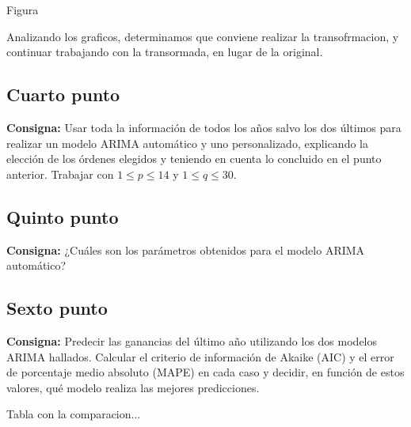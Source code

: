 \documentclass{article} %
\begin{document}
Figura

Analizando los graficos, determinamos que conviene realizar la transofrmacion, y continuar trabajando con la transormada, en lugar de la original. 

\subsection{Cuarto punto}

\textbf{Consigna:} Usar toda la información de todos los años salvo los dos últimos para realizar un modelo ARIMA automático y uno personalizado, explicando la elección de los órdenes elegidos y teniendo en cuenta lo concluido en el punto anterior. Trabajar con  $1 \leq p \leq 14$ y $1 \leq q \leq 30$.



\subsection{Quinto punto}

\textbf{Consigna:} ¿Cuáles son los parámetros obtenidos para el modelo ARIMA automático?



\subsection{Sexto punto}

\textbf{Consigna:} Predecir las ganancias del último año utilizando los dos modelos ARIMA hallados. Calcular el criterio de información de Akaike (AIC) y el error de porcentaje medio absoluto (MAPE) en cada caso y decidir, en función de estos valores, qué modelo realiza las mejores predicciones.

Tabla con la comparacion...
\end{document}
